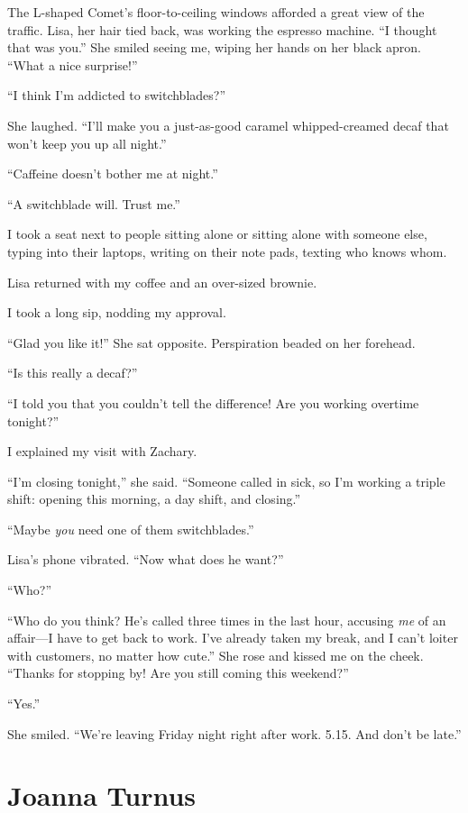 The L-shaped Comet's floor-to-ceiling windows afforded a great view of
the traffic. Lisa, her hair tied back, was working the espresso machine.
``I thought that was you.'' She smiled seeing me, wiping her hands on
her black apron. ``What a nice surprise!''

``I think I'm addicted to switchblades?''

She laughed. ``I'll make you a just-as-good caramel whipped-creamed
decaf that won't keep you up all night.''

``Caffeine doesn't bother me at night.''

``A switchblade will. Trust me.''

I took a seat next to people sitting alone or sitting alone with someone
else, typing into their laptops, writing on their note pads, texting who
knows whom.

Lisa returned with my coffee and an over-sized brownie.

I took a long sip, nodding my approval.

``Glad you like it!'' She sat opposite. Perspiration beaded on her
forehead.

``Is this really a decaf?''

``I told you that you couldn't tell the difference! Are you working
overtime tonight?''

I explained my visit with Zachary.

``I'm closing tonight,'' she said. ``Someone called in sick, so I'm
working a triple shift: opening this morning, a day shift, and
closing.''

``Maybe \emph{you} need one of them switchblades.''

Lisa's phone vibrated. ``Now what does he want?''

``Who?''

``Who do you think? He's called three times in the last hour, accusing
\emph{me} of an affair---I have to get back to work. I've already taken
my break, and I can't loiter with customers, no matter how cute.'' She
rose and kissed me on the cheek. ``Thanks for stopping by! Are you still
coming this weekend?''

``Yes.''

She smiled. ``We're leaving Friday night right after work. 5.15. And
don't be late.''

\chapter{Joanna Turnus}

